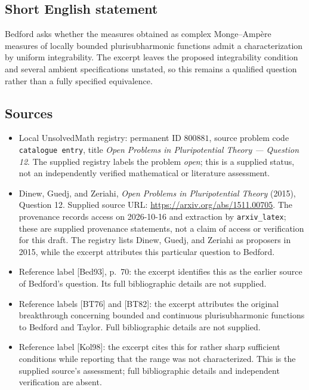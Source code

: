 \documentclass[11pt]{article}
\begin{document}
\subsection{Short English statement}
Bedford asks whether the measures obtained as complex Monge--Amp\`ere measures of locally bounded plurisubharmonic functions admit a characterization by uniform integrability. The excerpt leaves the proposed integrability condition and several ambient specifications unstated, so this remains a qualified question rather than a fully specified equivalence.
\subsection{Sources}
\begin{itemize}
\item Local UnsolvedMath registry: permanent ID \(800881\), source problem code \texttt{catalogue entry}, title \emph{Open Problems in Pluripotential Theory --- Question 12}. The supplied registry labels the problem \emph{open}; this is a supplied status, not an independently verified mathematical or literature assessment.
\item Dinew, Guedj, and Zeriahi, \emph{Open Problems in Pluripotential Theory} (2015), Question 12. Supplied source URL: \url{https://arxiv.org/abs/1511.00705}. The provenance records access on 2026-10-16 and extraction by \texttt{arxiv\_latex}; these are supplied provenance statements, not a claim of access or verification for this draft. The registry lists Dinew, Guedj, and Zeriahi as proposers in 2015, while the excerpt attributes this particular question to Bedford.
\item Reference label [Bed93], p.~70: the excerpt identifies this as the earlier source of Bedford's question. Its full bibliographic details are not supplied.
\item Reference labels [BT76] and [BT82]: the excerpt attributes the original breakthrough concerning bounded and continuous plurisubharmonic functions to Bedford and Taylor. Full bibliographic details are not supplied.
\item Reference label [Kol98]: the excerpt cites this for rather sharp sufficient conditions while reporting that the range was not characterized. This is the supplied source's assessment; full bibliographic details and independent verification are absent.
\end{itemize}
\end{document}
